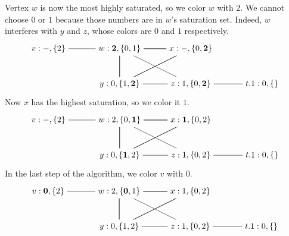 \documentclass[11pt]{book}
\begin{document}
Vertex $w$ is now the most highly saturated, so we color $w$ with $2$.
We cannot choose $0$ or $1$ because those numbers are in $w$'s
saturation set. Indeed, $w$ interferes with $y$ and $z$, whose colors
are $0$ and $1$ respectively.
\[
\begin{tikzpicture}[baseline=(current  bounding  box.center)]
\node (v) at (0,0)   {$v:-,\{2\}$};
\node (w) at (3,0)   {$w:\mathbf{2},\{0,1\}$};
\node (x) at (6,0)   {$x:-,\{0,\mathbf{2}\}$};
\node (y) at (3,-1.5)  {$y:0,\{1,\mathbf{2}\}$};
\node (z) at (6,-1.5)  {$z:1,\{0,\mathbf{2}\}$};
\node (t1) at (9,-1.5)   {$t.1:0,\{\}$};
\draw (t1) to (z);
\draw (v) to (w);
\foreach \i in {w,x,y}
{
  \foreach \j in {w,x,y}
  {
    \draw (\i) to (\j);
  }
}
\draw (z) to (w);
\draw (z) to (y);
\end{tikzpicture}
\]
Now $x$ has the highest saturation, so we color it $1$.
\[
\begin{tikzpicture}[baseline=(current  bounding  box.center)]
\node (v) at (0,0)   {$v:-,\{2\}$};
\node (w) at (3,0)   {$w:2,\{0,\mathbf{1}\}$};
\node (x) at (6,0)   {$x:\mathbf{1},\{0,2\}$};
\node (y) at (3,-1.5)  {$y:0,\{\mathbf{1},2\}$};
\node (z) at (6,-1.5)  {$z:1,\{0,2\}$};
\node (t1) at (9,-1.5)   {$t.1:0,\{\}$};
\draw (t1) to (z);
\draw (v) to (w);
\foreach \i in {w,x,y}
{
  \foreach \j in {w,x,y}
  {
    \draw (\i) to (\j);
  }
}
\draw (z) to (w);
\draw (z) to (y);
\end{tikzpicture}
\]
In the last step of the algorithm, we color $v$ with $0$.
\[
\begin{tikzpicture}[baseline=(current  bounding  box.center)]
\node (v) at (0,0)   {$v:\mathbf{0},\{2\}$};
\node (w) at (3,0)   {$w:2,\{\mathbf{0},1\}$};
\node (x) at (6,0)   {$x:1,\{0,2\}$};
\node (y) at (3,-1.5)  {$y:0,\{1,2\}$};
\node (z) at (6,-1.5)  {$z:1,\{0,2\}$};
\node (t1) at (9,-1.5)   {$t.1:0,\{\}$};
\draw (t1) to (z);
\draw (v) to (w);
\foreach \i in {w,x,y}
{
  \foreach \j in {w,x,y}
  {
    \draw (\i) to (\j);
  }
}
\draw (z) to (w);
\draw (z) to (y);
\end{tikzpicture}
\]
\end{document}
